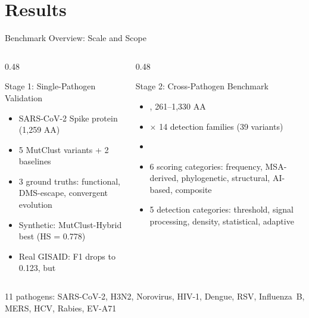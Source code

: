 \section{Results}

\begin{frame}{Benchmark Overview: Scale and Scope}
  \begin{columns}[T]
    \begin{column}{0.48\textwidth}
      \begin{block}{Stage 1: Single-Pathogen Validation}
        \begin{itemize}
          \item SARS-CoV-2 Spike protein (1,259 AA)
          \item 5 MutClust variants + 2 baselines
          \item 3 ground truths: functional, DMS-escape, convergent evolution
          \item Synthetic: MutClust-Hybrid best (HS = 0.778)
          \item Real GISAID: F1 drops to 0.123, but 
        \end{itemize}
      \end{block}
    \end{column}
    \begin{column}{0.48\textwidth}
      \begin{block}{Stage 2: Cross-Pathogen Benchmark}
        \begin{itemize}
          \item {}, 261--1,330 AA
          \item {} $\times$ 14 detection families (39 variants)
          \item {}
          \item 6 scoring categories: frequency, MSA-derived, phylogenetic, structural, AI-based, composite
          \item 5 detection categories: threshold, signal processing, density, statistical, adaptive
        \end{itemize}
      \end{block}
    \end{column}
  \end{columns}
  \vspace{0.5em}
  \centering
  {\small 11 pathogens: SARS-CoV-2, H3N2, Norovirus, HIV-1, Dengue, RSV, Influenza~B, MERS, HCV, Rabies, EV-A71}
\end{frame}

